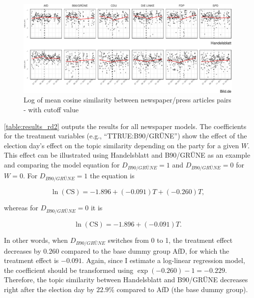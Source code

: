 \documentclass[
  12pt,
]{article}
\begin{document}
\begin{figure}

{\centering \includegraphics[width=1\linewidth]{main_text_files/figure-latex/Daily mean cosine similarity - rd example-1} 

}

\caption{Log of mean cosine similarity between newspaper/press articles pairs - with cutoff value \label{fig:mean_cosine_sim_rd_example}}\label{fig:Daily mean cosine similarity - rd example}
\end{figure}

\autoref{table:results_rd2} outputs the results for all newspaper
models. The coefficients for the treatment variables (e.g.,
``TTRUE:B90/GRÜNE'') show the effect of the election day's effect on the
topic similarity depending on the party for a given \(W\). This effect
can be illustrated using Handelsblatt and B90/GRÜNE as an example and
comparing the model equation for \(D_{B90/GRÜNE} = 1\) and
\(D_{B90/GRÜNE} = 0\) for \(W=0\). For \(D_{B90/GRÜNE} = 1\) the
equation is

\[
\ln(\text{CS})=-1.896+(-0.091)T+(-0.260)T,
\]

whereas for \(D_{B90/GRÜNE} = 0\) it is

\[
\ln(\text{CS})=-1.896+(-0.091)T.
\]

In other words, when \(D_{B90/GRÜNE}\) switches from 0 to 1, the
treatment effect decreases by \(0.260\) compared to the base dummy group
AfD, for which the treatment effect is \(-0.091\). Again, since I
estimate a log-linear regression model, the coefficient should be
transformed using \(\exp(-0.260)-1 = -0.229\). Therefore, the topic
similarity between Handelsblatt and B90/GRÜNE decreases right after the
election day by \(22.9\%\) compared to AfD (the base dummy group).
\end{document}
